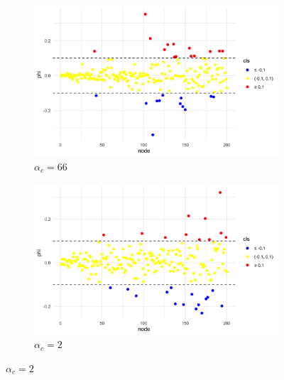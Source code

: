 \begin{figure}[H] %
  \centering
  \begin{subfigure}{0.43\textwidth}
    \centering
    \includegraphics[width=\linewidth]{Graphs/Model2_phi66_vs_node_N=200.png}
    \caption{\(\alpha_c=66\)}
  \end{subfigure}\hfill
  \begin{subfigure}{0.43\textwidth}
    \centering
    \includegraphics[width=\linewidth]{Graphs/Model2_phi2_vs_node.png}
    \caption{\(\alpha_c=2\)}
  \end{subfigure}

  \vspace{0.6em}


\end{figure}
